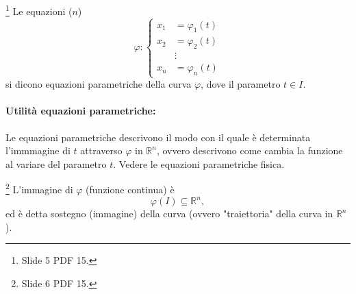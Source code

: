 \begin{definition}\footnote{Slide 5 PDF 15.}
	Le equazioni ($n$)
	\begin{equation*}
		\varphi:\begin{cases}
			x_1 &= \varphi_1(t)\\
			x_2 &= \varphi_2(t)\\
			&\vdots\\
			x_n &= \varphi_n(t)
		\end{cases}
	\end{equation*}
	si dicono equazioni parametriche della curva $\varphi$, dove il parametro $t\in I$.
\end{definition}

\paragraph{Utilità equazioni parametriche:} Le equazioni parametriche descrivono il modo con il quale è determinata l'immmagine di $t$ attraverso $\varphi$ in $\mathbb{R}^n$, ovvero descrivono come cambia la funzione al variare del parametro $t$. Vedere le equazioni parametriche fisica.

\begin{definition}\footnote{Slide 6 PDF 15.}
	L'immagine di $\varphi$ (funzione continua) è
	\begin{equation*}
		\varphi(I)\subseteq\mathbb{R}^n,
	\end{equation*} 
	ed è detta sostegno (immagine) della curva (ovvero "traiettoria" della curva in $\mathbb{R}^n$).
\end{definition}

